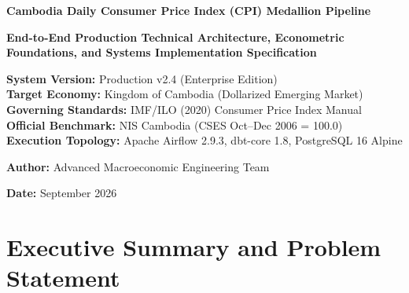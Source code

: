 \documentclass[11pt,a4paper]{article}
\begin{document}
\begin{titlepage}
    \centering
    \vspace*{1.5cm}
    
    {\Huge\bfseries\color{NavyBlue} Cambodia Daily Consumer Price Index (CPI) Medallion Pipeline\par}
    \vspace{0.8cm}
    {\LARGE\bfseries\color{Teal} End-to-End Production Technical Architecture, Econometric Foundations, and Systems Implementation Specification\par}
    \vspace{1.5cm}
    
    \begin{tcolorbox}[colback=white,colframe=Teal,width=0.9\textwidth]
        \centering\normalsize
        \textbf{System Version:} Production v2.4 (Enterprise Edition)\\
        \textbf{Target Economy:} Kingdom of Cambodia (Dollarized Emerging Market)\\
        \textbf{Governing Standards:} IMF/ILO (2020) Consumer Price Index Manual\\
        \textbf{Official Benchmark:} NIS Cambodia (CSES Oct--Dec 2006 = 100.0)\\
        \textbf{Execution Topology:} Apache Airflow 2.9.3, dbt-core 1.8, PostgreSQL 16 Alpine
    \end{tcolorbox}
    
    \vfill
    
    {\large\textbf{Author:} Advanced Macroeconomic Engineering Team\par}
    {\large\textbf{Date:} September 2026\par}
    \vspace{1cm}
\end{titlepage}

\tableofcontents
\newpage

\section{Executive Summary and Problem Statement}
\end{document}
